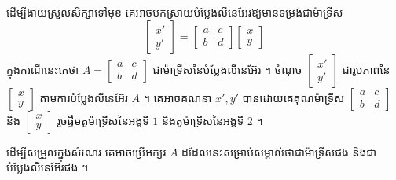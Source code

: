 ដើម្បីងាយស្រួលសិក្សាទៅមុខ គេអាចបកស្រាយបំប្លែងលីនេអ៊ែរឱ្យមានទម្រង់ជាម៉ាទ្រីស
\[ \begin{bmatrix} x'\\ y' \end{bmatrix} = \begin{bmatrix} a & c\\ b & d \end{bmatrix}\begin{bmatrix} x\\ y \end{bmatrix} \]
ក្នុងករណីនេះគេថា $A = \begin{bmatrix} a & c\\ b & d \end{bmatrix}$ ជាម៉ាទ្រីសនៃបំប្លែងលីនេអ៊ែរ ។ ចំណុច $\begin{bmatrix} x'\\ y' \end{bmatrix}$ ជារូបភាពនៃ $\begin{bmatrix} x\\ y \end{bmatrix}$ តាមការបំប្លែងលីនេអ៊ែរ $A$ ។ គេអាចគណនា $x', y'$ បានដោយគេគុណម៉ាទ្រីស $\begin{bmatrix} a & c\\ b & d \end{bmatrix}$ និង $\begin{bmatrix} x\\ y \end{bmatrix}$ រួចផ្ទឹមតួម៉ាទ្រីសនៃអង្គទី $1$ និងតួម៉ាទ្រីសនៃអង្គទី $2$ ។

\begin{note}[សម្គាល់]
ដើម្បីសម្រួលក្នុងសំណេរ គេអាចប្រើអក្សរ $A$ ដដែលនេះសម្រាប់សម្គាល់ថាជាម៉ាទ្រីសផង និងជាបំប្លែងលីនេអ៊ែរផង ។
\end{note}

